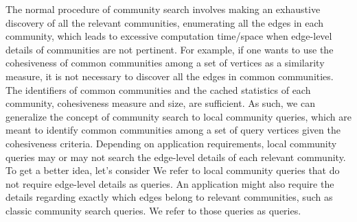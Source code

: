 The normal procedure of community search involves making an exhaustive discovery of all the relevant communities, \ie enumerating all the edges in each community, which leads to excessive computation time/space when edge-level details of communities are not pertinent. %
For example, if one wants to use the cohesiveness of common communities among a set of vertices as a similarity measure, it is not necessary to discover all the edges in common communities. The identifiers of common communities and the cached statistics of each community, \eg cohesiveness measure and size, are sufficient. As such, we can generalize the concept of community search to local community queries, which are meant to identify common communities among a set of query vertices given the cohesiveness criteria. Depending on application requirements, local community queries may or may not search the edge-level details of each relevant community. 
To get a better idea, let's consider  We refer to local community queries that do not require edge-level details as \toplevelprob{} queries. An application might also require the details regarding exactly which edges belong to relevant communities, such as classic community search queries. We refer to those queries as \bottomlevelprob{} queries.


